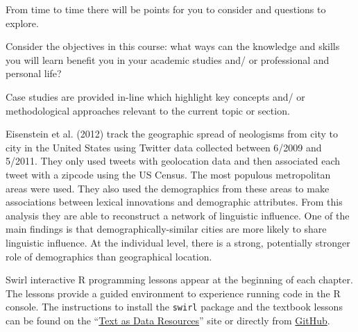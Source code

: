 \documentclass[
  letterpaper,
]{latex/krantz}
\begin{document}
From time to time there will be points for you to consider and questions
to explore.

\begin{tcolorbox}[enhanced jigsaw, opacitybacktitle=0.6, breakable, colframe=quarto-callout-important-color-frame, arc=.35mm, left=2mm, leftrule=.75mm, title=\textcolor{quarto-callout-important-color}{\faExclamation}\hspace{0.5em}{Consider}, opacityback=0, colback=white, toptitle=1mm, rightrule=.15mm, titlerule=0mm, bottomtitle=1mm, bottomrule=.15mm, coltitle=black, colbacktitle=quarto-callout-important-color!10!white, toprule=.15mm]
Consider the objectives in this course: what ways can the knowledge and
skills you will learn benefit you in your academic studies and/ or
professional and personal life?
\end{tcolorbox}

Case studies are provided in-line which highlight key concepts and/ or
methodological approaches relevant to the current topic or section.

\begin{tcolorbox}[enhanced jigsaw, opacitybacktitle=0.6, breakable, colframe=quarto-callout-caution-color-frame, arc=.35mm, left=2mm, leftrule=.75mm, title=\textcolor{quarto-callout-caution-color}{\faFire}\hspace{0.5em}{Case study}, opacityback=0, colback=white, toptitle=1mm, rightrule=.15mm, titlerule=0mm, bottomtitle=1mm, bottomrule=.15mm, coltitle=black, colbacktitle=quarto-callout-caution-color!10!white, toprule=.15mm]
Eisenstein et al. (2012) track the geographic spread of neologisms from
city to city in the United States using Twitter data collected between
6/2009 and 5/2011. They only used tweets with geolocation data and then
associated each tweet with a zipcode using the US Census. The most
populous metropolitan areas were used. They also used the demographics
from these areas to make associations between lexical innovations and
demographic attributes. From this analysis they are able to reconstruct
a network of linguistic influence. One of the main findings is that
demographically-similar cities are more likely to share linguistic
influence. At the individual level, there is a strong, potentially
stronger role of demographics than geographical location.
\end{tcolorbox}

Swirl interactive R programming lessons appear at the beginning of each
chapter. The lessons provide a guided environment to experience running
code in the R console. The instructions to install the \texttt{swirl}
package and the textbook lessons can be found on the
``\href{https://lin380.github.io/tadr}{Text as Data Resources}'' site or
directly from \href{https://github.com/lin380/swirl}{GitHub}.
\end{document}
